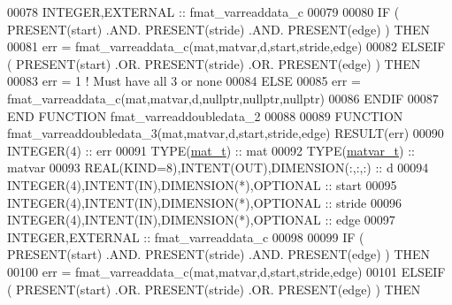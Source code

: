 \begin{DoxyCode}
00078     \textcolor{keywordtype}{INTEGER},\textcolor{keywordtype}{EXTERNAL}                            :: fmat\_varreaddata\_c
00079 
00080     \textcolor{keywordflow}{IF} ( \textcolor{keyword}{PRESENT}(start) .AND. \textcolor{keyword}{PRESENT}(stride) .AND. \textcolor{keyword}{PRESENT}(edge) ) \textcolor{keywordflow}{THEN}
00081         err = fmat\_varreaddata\_c(mat,matvar,d,start,stride,edge)
00082     \textcolor{keywordflow}{ELSEIF} ( \textcolor{keyword}{PRESENT}(start) .OR. \textcolor{keyword}{PRESENT}(stride) .OR. \textcolor{keyword}{PRESENT}(edge) ) \textcolor{keywordflow}{THEN}
00083         err = 1    \textcolor{comment}{! Must have all 3 or none}
00084     \textcolor{keywordflow}{ELSE}
00085         err = fmat\_varreaddata\_c(mat,matvar,d,nullptr,nullptr,nullptr)
00086 \textcolor{keywordflow}{    ENDIF}
00087 \textcolor{keyword}{END FUNCTION }fmat\_varreaddoubledata\_2
00088 
00089 \textcolor{keyword}{FUNCTION }fmat\_varreaddoubledata\_3(mat,matvar,d,start,stride,edge) \textcolor{keyword}{RESULT}(err)
00090     \textcolor{keywordtype}{INTEGER(4)}                                  :: err
00091     \textcolor{keywordtype}{TYPE}(\hyperlink{group___m_a_t_gab0fc888f5a5d79943b16284b1f91c2e8}{mat\_t})                                 :: mat
00092     \textcolor{keywordtype}{TYPE}(\hyperlink{group___m_a_t_structmatvar__t}{matvar\_t})                              :: matvar
00093     \textcolor{keywordtype}{REAL(KIND=8)},\textcolor{keywordtype}{INTENT(OUT)},\textcolor{keywordtype}{DIMENSION(:,:,:)}   :: d
00094     \textcolor{keywordtype}{INTEGER(4)},\textcolor{keywordtype}{INTENT(IN)},\textcolor{keywordtype}{DIMENSION(*)},\textcolor{keywordtype}{OPTIONAL} :: start
00095     \textcolor{keywordtype}{INTEGER(4)},\textcolor{keywordtype}{INTENT(IN)},\textcolor{keywordtype}{DIMENSION(*)},\textcolor{keywordtype}{OPTIONAL} :: stride
00096     \textcolor{keywordtype}{INTEGER(4)},\textcolor{keywordtype}{INTENT(IN)},\textcolor{keywordtype}{DIMENSION(*)},\textcolor{keywordtype}{OPTIONAL} :: edge
00097     \textcolor{keywordtype}{INTEGER},\textcolor{keywordtype}{EXTERNAL}                            :: fmat\_varreaddata\_c
00098 
00099     \textcolor{keywordflow}{IF} ( \textcolor{keyword}{PRESENT}(start) .AND. \textcolor{keyword}{PRESENT}(stride) .AND. \textcolor{keyword}{PRESENT}(edge) ) \textcolor{keywordflow}{THEN}
00100         err = fmat\_varreaddata\_c(mat,matvar,d,start,stride,edge)
00101     \textcolor{keywordflow}{ELSEIF} ( \textcolor{keyword}{PRESENT}(start) .OR. \textcolor{keyword}{PRESENT}(stride) .OR. \textcolor{keyword}{PRESENT}(edge) ) \textcolor{keywordflow}{THEN}

\end{DoxyCode}
